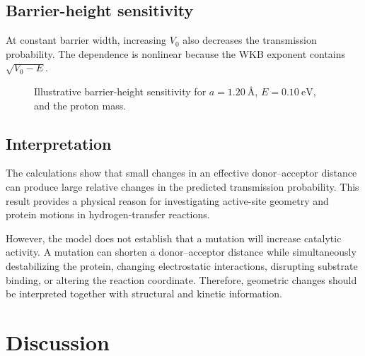 \documentclass[11pt,a4paper]{article}
\newcommand{\WKB}{\mathrm{WKB}}
\newcommand{\trans}{\mathcal{T}}
\newcommand{\angstromunit}{\text{\AA}}
\begin{document}
\subsection{Barrier-height sensitivity}

At constant barrier width, increasing $V_0$ also decreases the transmission
probability. The dependence is nonlinear because the WKB exponent contains
$\sqrt{V_0-E}$.

\begin{figure}[htbp]
\centering
{}
\caption{
Illustrative barrier-height sensitivity for
$a=\SI{1.20}{\angstromunit}$,
$E=\SI{0.10}{\electronvolt}$, and the proton mass.
}
\label{fig:height}
\end{figure}

\subsection{Interpretation}

The calculations show that small changes in an effective donor--acceptor
distance can produce large relative changes in the predicted transmission
probability. This result provides a physical reason for investigating active-site
geometry and protein motions in hydrogen-transfer reactions.

However, the model does not establish that a mutation will increase catalytic
activity. A mutation can shorten a donor--acceptor distance while simultaneously
destabilizing the protein, changing electrostatic interactions, disrupting
substrate binding, or altering the reaction coordinate. Therefore, geometric
changes should be interpreted together with structural and kinetic information.

\section{Discussion}
\end{document}
